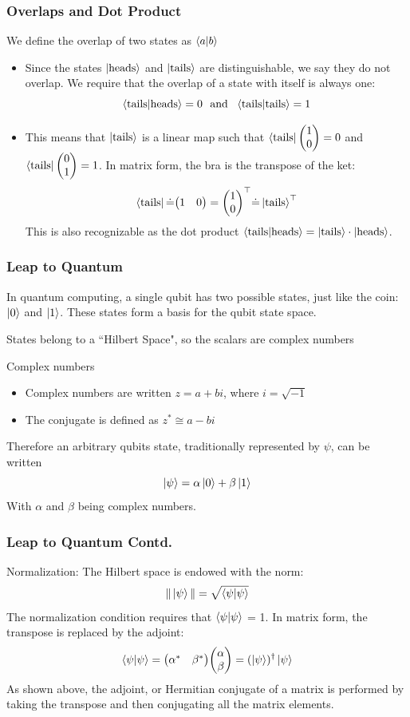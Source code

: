 \documentclass{beamer}
\begin{document}
\begin{frame}
\frametitle{Overlaps and Dot Product}
We define the overlap of two states as $\braket{a}{b}$
\begin{itemize}
\item Since the states $\ket{\text{heads}}$ and $\ket{\text{tails}}$ are distinguishable, we say they do not overlap. We require that the overlap of a state with itself is always one:
$$\braket{\text{tails}}{\text{heads}} = 0 \ \ \text{and} \ \ \braket{\text{tails}}{\text{tails}} = 1
$$
\item This means that $\ket{\text{tails}}$ is a linear map such that $\bra{\text{tails}}\mqty(1 \\ 0) = 0$ and $\bra{\text{tails}}\mqty(0 \\ 1) = 1$. In matrix form, the bra is the transpose of the ket:
$$
\bra{\text{tails}} \dot= \mqty(1 & 0) = \mqty(1 \\ 0)^\top \dot = \ket{\text{tails}}^\top
$$
This is also recognizable as the dot product $\braket{\text{tails}}{\text{heads}} = \ket{\text{tails}} \cdot \ket{\text{heads}}$.
\end{itemize}
\end{frame}
\begin{frame}
\frametitle{Leap to Quantum}
In quantum computing, a single qubit has two possible states, just like the coin: $\ket{0}$ and $\ket{1}$. These states form a basis for the qubit state space.\vspace{.5cm}

States belong to a ``Hilbert Space", so the scalars are complex numbers
\begin{alertblock}{Complex numbers}
\begin{itemize}
\item Complex numbers are written $z = a+bi$, where $i = \sqrt{-1}$
\item The conjugate is defined as $z^\ast \cong a-bi$
\end{itemize}
\end{alertblock}
Therefore an arbitrary qubits state, traditionally represented by $\psi$, can be written 
$$
\ket{\psi} = \alpha \ket{0} + \beta \ket{1}
$$
With $\alpha$ and $\beta$ being complex numbers.
\end{frame}
\begin{frame}
\frametitle{Leap to Quantum Contd.}
Normalization: The Hilbert space is endowed with the norm:
$$
\Vert \ket{\psi} \Vert = \sqrt{\braket{\psi}{\psi}}
$$
The normalization condition requires that $\braket{\psi}{\psi}$ = 1. In matrix form, the transpose is replaced by the adjoint:
$$
\braket{\psi}{\psi} = \mqty(\alpha^\ast & \beta^\ast)\mqty(\alpha \\ \beta) = (\ket{\psi})^\dagger \ket{\psi}
$$
As shown above, the adjoint, or Hermitian conjugate of a matrix is performed by taking the transpose and then conjugating all the matrix elements.
\end{frame}
\end{document}
